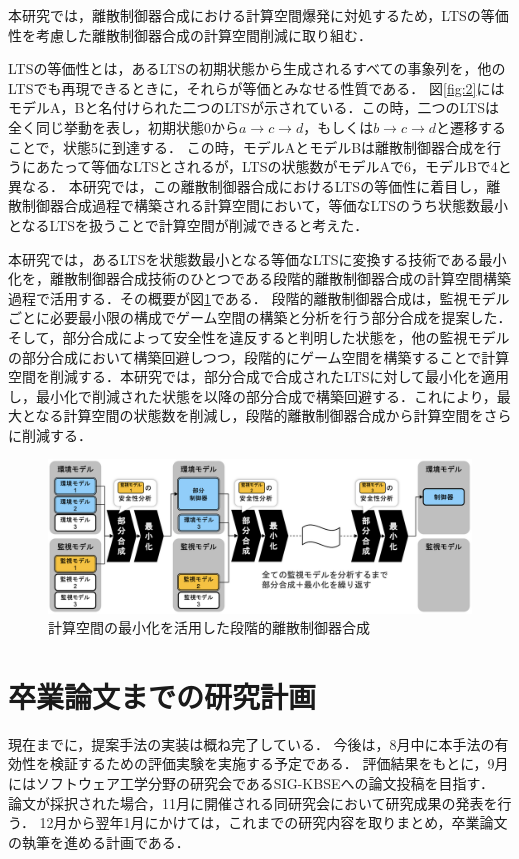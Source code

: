 \documentclass[11pt]{jarticle}
\begin{document}
本研究では，離散制御器合成における計算空間爆発に対処するため，LTSの等価性を考慮した離散制御器合成の計算空間削減に取り組む．

LTSの等価性とは，あるLTSの初期状態から生成されるすべての事象列を，他のLTSでも再現できるときに，それらが等価とみなせる性質である．
図\ref{fig:2}にはモデルA，Bと名付けられた二つのLTSが示されている．この時，二つのLTSは全く同じ挙動を表し，初期状態0から$a \rightarrow c \rightarrow d$，もしくは$b \rightarrow c \rightarrow d$と遷移することで，状態5に到達する．
この時，モデルAとモデルBは離散制御器合成を行うにあたって等価なLTSとされるが，LTSの状態数がモデルAで6，モデルBで4と異なる．
本研究では，この離散制御器合成におけるLTSの等価性に着目し，離散制御器合成過程で構築される計算空間において，等価なLTSのうち状態数最小となるLTSを扱うことで計算空間が削減できると考えた．

本研究では，あるLTSを状態数最小となる等価なLTSに変換する技術である最小化を，離散制御器合成技術のひとつである段階的離散制御器合成\cite{yamauchi}の計算空間構築過程で活用する．その概要が図\ref{fig:3}である．
段階的離散制御器合成\cite{yamauchi}は，監視モデルごとに必要最小限の構成でゲーム空間の構築と分析を行う部分合成を提案した．そして，部分合成によって安全性を違反すると判明した状態を，他の監視モデルの部分合成において構築回避しつつ，段階的にゲーム空間を構築することで計算空間を削減する．本研究では，部分合成で合成されたLTSに対して最小化を適用し，最小化で削減された状態を以降の部分合成で構築回避する．これにより，最大となる計算空間の状態数を削減し，段階的離散制御器合成から計算空間をさらに削減する．

\begin{figure}[h]
  \centering
  \includegraphics[width=14.5cm]{./figures/proposal.png}
  \caption{計算空間の最小化を活用した段階的離散制御器合成}
  \label{fig:3}
\end{figure}


\section{卒業論文までの研究計画}
現在までに，提案手法の実装は概ね完了している．
今後は，8月中に本手法の有効性を検証するための評価実験を実施する予定である．
評価結果をもとに，9月にはソフトウェア工学分野の研究会であるSIG-KBSEへの論文投稿を目指す．
論文が採択された場合，11月に開催される同研究会において研究成果の発表を行う．
12月から翌年1月にかけては，これまでの研究内容を取りまとめ，卒業論文の執筆を進める計画である．
\end{document}

